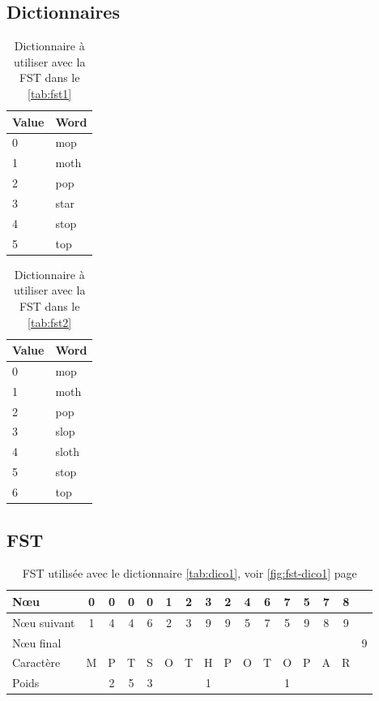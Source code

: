 \subsection{Dictionnaires}

\begin{table}[h]
    \centering
    \begin{tabular}{|l|l|}
        \hline
        Value & Word \\
        \hline
        0 & mop \\
        1 & moth \\
        2 & pop \\
        3 & star \\
        4 & stop \\
        5 & top \\
        \hline
    \end{tabular}
    \caption{Dictionnaire à utiliser avec la FST dans le \autoref{tab:fst1}}
    \label{tab:dico1}
\end{table}

\begin{table}[h]
    \centering
    \begin{tabular}{|l|l|}
        \hline
        Value & Word \\
        \hline
        0 & mop \\
        1 & moth \\
        2 & pop \\
        3 & slop \\
        4 & sloth \\
        5 & stop \\
        6 & top \\
        \hline
    \end{tabular}
    \caption{Dictionnaire à utiliser avec la FST dans le \autoref{tab:fst2}}
    \label{tab:dico2}
\end{table}

\clearpage
\subsection{FST}

\begin{table}[ht]
    \centering
    \begin{tabular}{|l||c|c|c|c|c|c|c|c|c|c|c|c|c|c|c|}
        \hline
        N\oe u & 0 & 0 & 0 & 0 & 1 & 2 & 3 & 2 & 4 & 6 & 7 & 5 & 7 & 8 & \\ \hline
        N\oe u suivant & 1 & 4 & 4 & 6 & 2 & 3 & 9 & 9 & 5 & 7 & 5 & 9 & 8 & 9 & \\ \hline
        N\oe u final &&&&&&&&&&&&&&& 9 \\ \hline
        Caractère & M & P & T & S& O & T & H & P & O & T & O & P & A & R & \\ \hline
        Poids & & 2 & 5 & 3 &&& 1 &&&&1&&&& \\ \hline
    \end{tabular}
    \caption{FST utilisée avec le dictionnaire \autoref{tab:dico1}, voir \autoref{fig:fst-dico1} page \pageref{fig:fst-dico1}}
    \label{tab:fst1}
\end{table}

